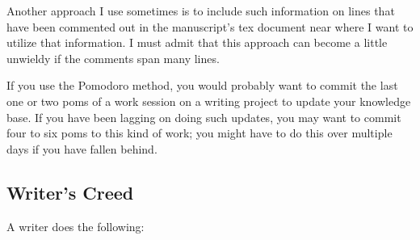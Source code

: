 \documentclass[11pt,letterpaper]{article}
\begin{document}
Another approach I use sometimes is to include such information on lines
that have been commented out in the manuscript's tex document near where
I want to utilize that information. I must admit that this approach can
become a little unwieldy if the comments span many lines.

If you use the Pomodoro method, you would probably want to commit the
last one or two poms of a work session on a writing project to update
your knowledge base. If you have been lagging on doing such updates, you
may want to commit four to six poms to this kind of work; you might have
to do this over multiple days if you have fallen behind.




\subsection{Writer's Creed}
\label{sec:org779bb88}

A writer does the following:
\end{document}
